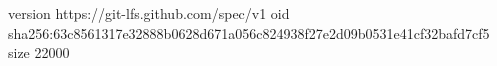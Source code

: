version https://git-lfs.github.com/spec/v1
oid sha256:63c8561317e32888b0628d671a056c824938f27e2d09b0531e41cf32bafd7cf5
size 22000
